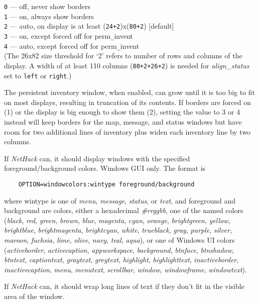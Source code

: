 {\tt 0} --- off, never show borders\\
{\tt 1} --- on, always show borders\\
{\tt 2} --- auto, on display is at least
(\verb&24+2&)x(\verb&80+2&) [default]\\
{\tt 3} --- on, except forced off for perm\verb+_+invent\\
{\tt 4} --- auto, except forced off for perm\verb+_+invent\\

(The 26x82 size threshold for `2' refers to number of rows and
columns of the display.
A width of at least 110 columns (\verb&80+2+26+2&) is needed for
{\it align_status\/}
set to {\tt left} or {\tt right}.)

The persistent inventory window, when enabled, can grow until it is
too big to fit on most displays, resulting in truncation of its contents.
If borders are forced on (1) or the display is big enough to show them (2),
setting the value to 3 or 4 instead will keep borders for the map, message,
and status windows but have room for two additional lines of inventory
plus widen each inventory line by two columns.
\item[\ib{windowcolors}]
If {\it NetHack\/} can, it should display windows with the specified
foreground/background colors.
Windows GUI only.
The format is
\begin{verbatim}
    OPTION=windowcolors:wintype foreground/background
\end{verbatim}

where wintype is one of {\it menu}, {\it message}, {\it status}, or {\it text}, and
foreground and background are colors, either a hexadecimal {\it \#rrggbb},
one of the named colors ({\it black}, {\it red}, {\it green}, {\it brown},
{\it blue}, {\it magenta}, {\it cyan}, {\it orange},
{\it brightgreen}, {\it yellow}, {\it brightblue}, {\it brightmagenta},
{\it brightcyan}, {\it white}, {\it trueblack}, {\it gray}, {\it purple},
{\it silver}, {\it maroon}, {\it fuchsia}, {\it lime}, {\it olive},
{\it navy}, {\it teal}, {\it aqua}), or one of Windows UI colors ({\it activeborder},
{\it activecaption}, {\it appworkspace}, {\it background}, {\it btnface}, {\it btnshadow},
{\it btntext}, {\it captiontext}, {\it graytext}, {\it greytext}, {\it highlight},
{\it highlighttext}, {\it inactiveborder}, {\it inactivecaption}, {\it menu},
{\it menutext}, {\it scrollbar}, {\it window}, {\it windowframe}, {\it windowtext}).

\item[\ib{wraptext}]
If {\it NetHack\/} can, it should wrap long lines of text if they don't fit
in the visible area of the window.
\elist

